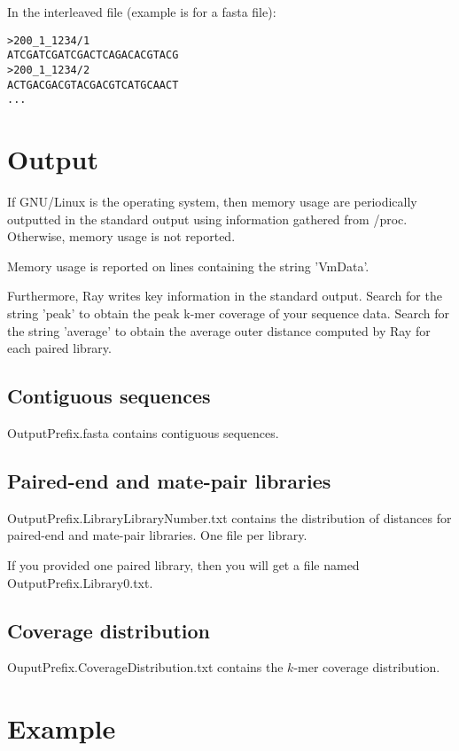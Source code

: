 \documentclass{article}
\begin{document}
In the interleaved file (example is for a fasta file):

\begin{verbatim}
>200_1_1234/1
ATCGATCGATCGACTCAGACACGTACG
>200_1_1234/2
ACTGACGACGTACGACGTCATGCAACT
...
\end{verbatim}



\section{Output}

If GNU/Linux is the operating system, then memory usage are periodically outputted in the 
standard output using information gathered from /proc. Otherwise, memory usage is not reported.

Memory usage is reported on lines containing the string 'VmData'.

Furthermore, Ray writes key information in the standard output.
Search for the string 'peak' to obtain the peak k-mer coverage of your sequence data.
Search for the string 'average' to obtain the average outer distance computed by Ray
for each paired library.

\subsection{Contiguous sequences}

OutputPrefix.fasta contains contiguous sequences.

\subsection{Paired-end and mate-pair libraries}

OutputPrefix.LibraryLibraryNumber.txt contains the distribution of distances for paired-end and mate-pair libraries. One file per library.

If you provided one paired library, then you will get a file named OutputPrefix.Library0.txt.

\subsection{Coverage distribution}

OuputPrefix.CoverageDistribution.txt contains the $k$-mer coverage distribution.

\section{Example}
\end{document}
